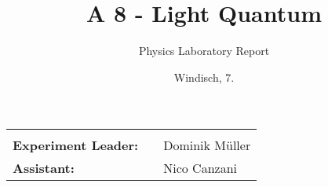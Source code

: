 \documentclass[final]{header/fhnwreport}
\title{\textbf{{\Huge A 8 - Light Quantum}}}
\author{{\Huge Physics Laboratory Report}}
\date{{\LARGE Windisch, 7.\MONTH \the\year}}
\begin{document}


\maketitle
\vfill
\begin{LARGE}
	\begin{tabularx}{\textwidth}{l p{0cm} X}
		\hline
		& & \\
		\textbf{Experiment Leader:} & & Dominik Müller \\
		\textbf{Assistant:} & & Nico Canzani \\
	\end{tabularx}
\end{LARGE}
\clearpage

\tableofcontents
\clearpage







\printbibliography[heading=bibintoc]
\label{sec:literature}




\ifdraft{
	\newpage
	\listoftodos[\section{To-Do}]
	\clearpage
}
{
}
\end{document}
